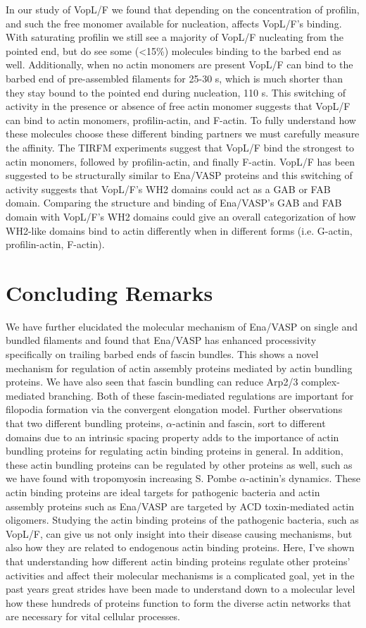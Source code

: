 In our study of VopL/F we found that depending on the concentration of profilin, and such the free monomer available for nucleation, affects VopL/F's binding. With saturating profilin we still see a majority of VopL/F nucleating from the pointed end, but do see some (<15\%) molecules binding to the barbed end as well. Additionally, when no actin monomers are present VopL/F can bind to the barbed end of pre-assembled filaments for 25-30 s, which is much shorter than they stay bound to the pointed end during nucleation, 110 s. This switching of activity in the presence or absence of free actin monomer suggests that VopL/F can bind to actin monomers, profilin-actin, and F-actin. To fully understand how these molecules choose these different binding partners we must carefully measure the affinity. The TIRFM experiments suggest that VopL/F bind the strongest to actin monomers, followed by profilin-actin, and finally F-actin. VopL/F has been suggested to be structurally similar to Ena/VASP proteins and this switching of activity suggests that VopL/F's WH2 domains could act as a GAB or FAB domain. Comparing the structure and binding of Ena/VASP's GAB and FAB domain with VopL/F's WH2 domains could give an overall categorization of how WH2-like domains bind to actin differently when in different forms (i.e. G-actin, profilin-actin, F-actin). 

\section{Concluding Remarks}\label{final-conclusions}
We have further elucidated the molecular mechanism of Ena/VASP on single and bundled filaments and found that Ena/VASP has enhanced processivity specifically on trailing barbed ends of fascin bundles. This shows a novel mechanism for regulation of actin assembly proteins mediated by actin bundling proteins. We have also seen that fascin bundling can reduce Arp2/3 complex-mediated branching. Both of these fascin-mediated regulations are important for filopodia formation via the convergent elongation model. Further observations that two different bundling proteins, $\alpha$-actinin and fascin, sort to different domains due to an intrinsic spacing property adds to the importance of actin bundling proteins for regulating actin binding proteins in general. In addition, these actin bundling proteins can be regulated by other proteins as well, such as we have found with tropomyosin increasing S. Pombe $\alpha$-actinin's dynamics. These actin binding proteins are ideal targets for pathogenic bacteria and actin assembly proteins such as Ena/VASP are targeted by ACD toxin-mediated actin oligomers. Studying the actin binding proteins of the pathogenic bacteria, such as VopL/F, can give us not only insight into their disease causing mechanisms, but also how they are related to endogenous actin binding proteins. Here, I've shown that understanding how different actin binding proteins regulate other proteins' activities and affect their molecular mechanisms is a complicated goal, yet in the past years great strides have been made to understand down to a molecular level how these hundreds of proteins function to form the diverse actin networks that are necessary for vital cellular processes.


